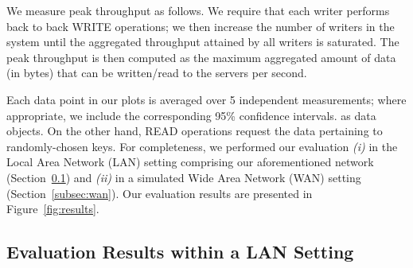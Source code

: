 \documentclass[10pt,conference,compsocconf]{IEEEtran}
\begin{document}
We measure peak throughput as follows. We require that each writer performs back to back \textsc{WRITE} operations; we then increase the number of writers in the system until
the aggregated throughput attained by all writers is saturated. The peak throughput is then computed as the maximum aggregated amount of data (in bytes) that can be written/read to the servers per second.

Each data point in our plots is averaged over 5 independent measurements; where appropriate, we include the corresponding 95\% confidence intervals. as data objects. On the other hand, \textsc{READ} operations request the data pertaining to randomly-chosen keys.
For completeness, we performed our evaluation \emph{(i)} in the Local Area Network (LAN) setting comprising our aforementioned network (Section~\ref{subsec:lan}) and \emph{(ii)} in a simulated Wide Area Network (WAN) setting (Section~\ref{subsec:wan}). Our evaluation results are presented in Figure~\ref{fig:results}.

\subsection{Evaluation Results within a LAN Setting}\label{subsec:lan}

\begin{figure*}[tb]
  \centering
           \hspace{.01in}
     \\
     \hspace{.01in}
     \caption{Evaluation Results. Data points are averaged over 5 independent runs; where appropriate, we include the corresponding 95\% confidence intervals.}
    \label{fig:results}
\end{figure*}
\end{document}

